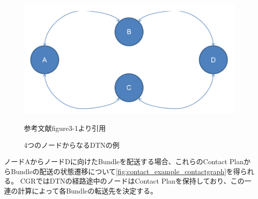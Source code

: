\begin{figure}[tbh]
    \centering
    \includegraphics[width=0.5\textheight]{img/contact_example_topology.pdf}
    \caption{4つのノードからなるDTNの例}
    \label{fig:contact_example_topology}
    \begin{minipage}{\textwidth}
        \centering
        \vspace{3mm}
        参考文献\cite{schedule_aware_bundle_routing}figure3-1より引用
    \end{minipage}
\end{figure}

ノードAからノードDに向けたBundleを配送する場合、これらのContact PlanからBundleの配送の状態遷移について\ref{fig:contact_example_contactgraph}を得られる。
CGRではDTNの経路途中のノードはContact Planを保持しており、この一連の計算によって各Bundleの転送先を決定する。




